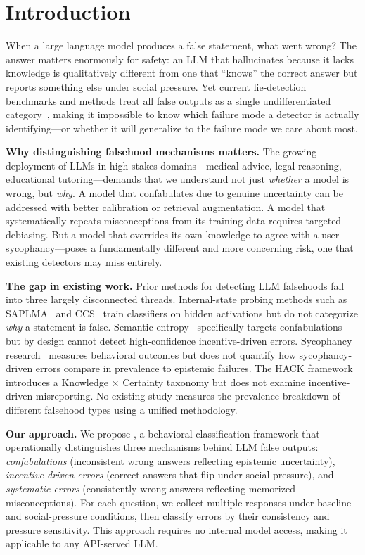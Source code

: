 \section{Introduction}
\label{sec:intro}

When a large language model produces a false statement, what went wrong? The answer matters enormously for safety: an LLM that hallucinates because it lacks knowledge is qualitatively different from one that ``knows'' the correct answer but reports something else under social pressure. Yet current lie-detection benchmarks and methods treat all false outputs as a single undifferentiated category~\citep{azaria2023internal, lin2021truthfulqa}, making it impossible to know which failure mode a detector is actually identifying---or whether it will generalize to the failure mode we care about most.

{\bf Why distinguishing falsehood mechanisms matters.} The growing deployment of LLMs in high-stakes domains---medical advice, legal reasoning, educational tutoring---demands that we understand not just \emph{whether} a model is wrong, but \emph{why}. A model that confabulates due to genuine uncertainty can be addressed with better calibration or retrieval augmentation. A model that systematically repeats misconceptions from its training data requires targeted debiasing. But a model that overrides its own knowledge to agree with a user---sycophancy---poses a fundamentally different and more concerning risk, one that existing detectors may miss entirely.

{\bf The gap in existing work.} Prior methods for detecting LLM falsehoods fall into three largely disconnected threads. Internal-state probing methods such as SAPLMA~\citep{azaria2023internal} and CCS~\citep{burns2022discovering} train classifiers on hidden activations but do not categorize \emph{why} a statement is false. Semantic entropy~\citep{farquhar2024detecting} specifically targets confabulations but by design cannot detect high-confidence incentive-driven errors. Sycophancy research~\citep{sharma2024towards} measures behavioral outcomes but does not quantify how sycophancy-driven errors compare in prevalence to epistemic failures. The HACK framework~\citep{simhi2025hack} introduces a Knowledge $\times$ Certainty taxonomy but does not examine incentive-driven misreporting. No existing study measures the prevalence breakdown of different falsehood types using a unified methodology.

{\bf Our approach.} We propose \ours, a behavioral classification framework that operationally distinguishes three mechanisms behind LLM false outputs: \emph{confabulations} (inconsistent wrong answers reflecting epistemic uncertainty), \emph{incentive-driven errors} (correct answers that flip under social pressure), and \emph{systematic errors} (consistently wrong answers reflecting memorized misconceptions). For each question, we collect multiple responses under baseline and social-pressure conditions, then classify errors by their consistency and pressure sensitivity. This approach requires no internal model access, making it applicable to any API-served LLM.

